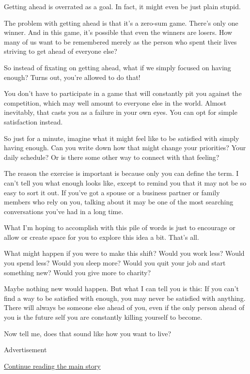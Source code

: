 Getting ahead is overrated as a goal. In fact, it might even be just
plain stupid.

The problem with getting ahead is that it's a zero-sum game. There's
only one winner. And in this game, it's possible that even the winners
are losers. How many of us want to be remembered merely as the person
who spent their lives striving to get ahead of everyone else?

So instead of fixating on getting ahead, what if we simply focused on
having enough? Turns out, you're allowed to do that!

You don't have to participate in a game that will constantly pit you
against the competition, which may well amount to everyone else in the
world. Almost inevitably, that casts you as a failure in your own eyes.
You can opt for simple satisfaction instead.

So just for a minute, imagine what it might feel like to be satisfied
with simply having enough. Can you write down how that might change your
priorities? Your daily schedule? Or is there some other way to connect
with that feeling?

The reason the exercise is important is because only you can define the
term. I can't tell you what enough looks like, except to remind you that
it may not be so easy to sort it out. If you've got a spouse or a
business partner or family members who rely on you, talking about it may
be one of the most searching conversations you've had in a long time.

What I'm hoping to accomplish with this pile of words is just to
encourage or allow or create space for you to explore this idea a bit.
That's all.

What might happen if you were to make this shift? Would you work less?
Would you spend less? Would you sleep more? Would you quit your job and
start something new? Would you give more to charity?

Maybe nothing new would happen. But what I can tell you is this: If you
can't find a way to be satisfied with enough, you may never be satisfied
with anything. There will always be someone else ahead of you, even if
the only person ahead of you is the future self you are constantly
killing yourself to become.

Now tell me, does that sound like how you want to live?

Advertisement

\protect\hyperlink{after-bottom}{Continue reading the main story}


